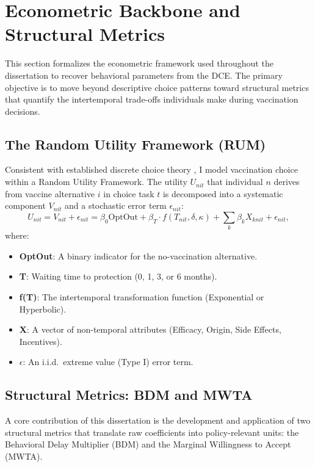 \documentclass[doublespacing]{utdthesis}
\begin{document}
\section{Econometric Backbone and Structural Metrics}
\label{sec:backbone_econometrics}

This section formalizes the econometric framework used throughout the dissertation to recover behavioral parameters from the DCE. The primary objective is to move beyond descriptive choice patterns toward structural metrics that quantify the intertemporal trade-offs individuals make during vaccination decisions.

\subsection{The Random Utility Framework (RUM)}
Consistent with established discrete choice theory \citep{Louviere2000, Train2009}, I model vaccination choice within a Random Utility Framework. The utility $U_{nit}$ that individual $n$ derives from vaccine alternative $i$ in choice task $t$ is decomposed into a systematic component $V_{nit}$ and a stochastic error term $\epsilon_{nit}$:
\begin{equation}
U_{nit} = V_{nit} + \epsilon_{nit} = \beta_{0} \text{OptOut} + \beta_{T} \cdot f(T_{nit}, \delta, \kappa) + \sum_{k} \beta_{k} X_{knit} + \epsilon_{nit},
\label{eq:rum_base}
\end{equation}
where:
\begin{itemize}
    \item \textbf{OptOut}: A binary indicator for the no-vaccination alternative.
    \item \textbf{T}: Waiting time to protection (0, 1, 3, or 6 months).
    \item \textbf{f(T)}: The intertemporal transformation function (Exponential or Hyperbolic).
    \item \textbf{X}: A vector of non-temporal attributes (Efficacy, Origin, Side Effects, Incentives).
    \item \textbf{$\epsilon$}: An i.i.d.\ extreme value (Type I) error term.
\end{itemize}

\subsection{Structural Metrics: BDM and MWTA}
A core contribution of this dissertation is the development and application of two structural metrics that translate raw coefficients into policy-relevant units: the Behavioral Delay Multiplier (BDM) and the Marginal Willingness to Accept (MWTA).
\end{document}
